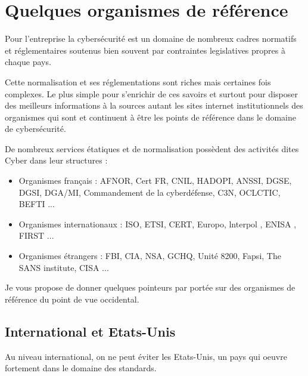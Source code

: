 %
%



\section{Quelques organismes de référence}

Pour l'entreprise la cybersécurité est un domaine  de nombreux cadres normatifs et réglementaires soutenus bien souvent par contraintes legislatives propres à chaque pays.

Cette normalisation et ses réglementations sont riches mais certaines fois complexes.
Le plus simple pour s'enrichir de ces savoirs et surtout pour disposer des meilleurs informations à la sources autant  les sites internet institutionnels des organismes qui sont et continuent à être les points de  référence dans le domaine de cybersécurité.

De nombreux services étatiques et de normalisation possèdent des activités dites Cyber dans leur structures :

\begin{itemize}
    \item  Organismes français : AFNOR, Cert FR, CNIL, HADOPI, ANSSI, DGSE, DGSI, DGA/MI, Commandement de la cyberdéfense, C3N, OCLCTIC, BEFTI ...
  \item  Organismes internationaux : ISO, ETSI, CERT, Europo, lnterpol , ENISA , FIRST ...
  \item  Organismes étrangers : FBI, CIA, NSA, GCHQ, Unité 8200, Fapsi, The SANS institute, CISA ...
\end{itemize}

Je vous propose de donner quelques pointeurs par portée sur des organismes de référence du point de vue occidental.

\subsection{International et Etats-Unis}

Au niveau international, on ne peut éviter les Etats-Unis, un pays qui oeuvre fortement dans le domaine des standards.

